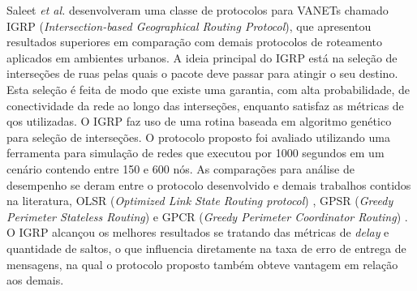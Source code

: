 Saleet {\em  et al.}   \cite{saleet:2011} desenvolveram uma  classe de
protocolos   para  VANETs   chamado   IGRP  ({\em   Intersection-based
  Geographical   Routing   Protocol}),   que   apresentou   resultados
superiores em comparação com demais protocolos de roteamento aplicados
em ambientes  urbanos.  A ideia principal  do IGRP está na  seleção de
interseções de  ruas pelas quais o  pacote deve passar para  atingir o
seu destino.   Esta seleção é feita  de modo que existe  uma garantia,
com  alta  probabilidade,  de  conectividade  da  rede  ao  longo  das
interseções, enquanto satisfaz as  métricas de \gls{qos} utilizadas. O
IGRP faz uso de uma rotina  baseada em algoritmo genético para seleção
de  interseções.  O  protocolo  proposto foi  avaliado utilizando  uma
ferramenta para simulação  de redes que executou por  1000 segundos em
um cenário contendo  entre 150 e 600 nós. As  comparações para análise
de  desempenho  se  deram  entre o  protocolo  desenvolvido  e  demais
trabalhos  contidos na  literatura,  OLSR ({\em  Optimized Link  State
  Routing protocol}) \cite{clausen:2003},  GPSR ({\em Greedy Perimeter
  Stateless Routing})  \cite{karp:2000} e GPCR ({\em  Greedy Perimeter
  Coordinator  Routing})  \cite{lochert:2005}.   O  IGRP  alcançou  os
melhores  resultados  se tratando  das  métricas  de \textit{delay}  e
quantidade de saltos, o que influencia  diretamente na taxa de erro de
entrega  de mensagens,  na  qual o  protocolo  proposto também  obteve
vantagem em relação aos demais.
